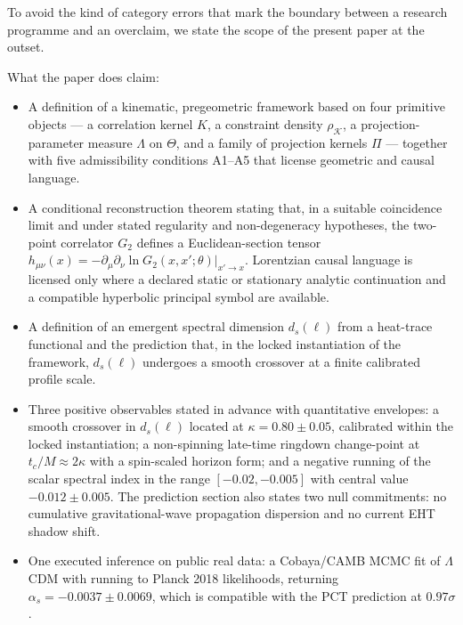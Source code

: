 ﻿\documentclass[12pt,a4paper]{article}
\theoremstyle{definition}
\begin{document}
To avoid the kind of category errors that mark the boundary between a research programme and an overclaim, we state the scope of the present paper at the outset.

What the paper does claim:
\begin{itemize}
  \item A definition of a kinematic, pregeometric framework based on four primitive objects --- a correlation kernel $K$, a constraint density $\rho_{\mathcal{K}}$, a projection-parameter measure $\Lambda$ on $\Theta$, and a family of projection kernels $\Pi$ --- together with five admissibility conditions A1--A5 that license geometric and causal language.
  \item A conditional reconstruction theorem stating that, in a suitable coincidence limit and under stated regularity and non-degeneracy hypotheses, the two-point correlator $G_2$ defines a Euclidean-section tensor $h_{\mu\nu}(x) = -\partial_\mu\partial_\nu \ln G_2(x,x';\theta)|_{x'\to x}$. Lorentzian causal language is licensed only where a declared static or stationary analytic continuation and a compatible hyperbolic principal symbol are available.
  \item A definition of an emergent spectral dimension $d_s(\ell)$ from a heat-trace functional and the prediction that, in the locked instantiation of the framework, $d_s(\ell)$ undergoes a smooth crossover at a finite calibrated profile scale.
  \item Three positive observables stated in advance with quantitative envelopes: a smooth crossover in $d_s(\ell)$ located at $\kappa = 0.80 \pm 0.05$, calibrated within the locked instantiation; a non-spinning late-time ringdown change-point at $t_c/M \approx 2\kappa$ with a spin-scaled horizon form; and a negative running of the scalar spectral index in the range $[-0.02,-0.005]$ with central value $-0.012 \pm 0.005$. The prediction section also states two null commitments: no cumulative gravitational-wave propagation dispersion and no current EHT shadow shift.
  \item One executed inference on public real data: a Cobaya/CAMB MCMC fit of $\Lambda$CDM with running to Planck 2018 likelihoods, returning $\alpha_s = -0.0037 \pm 0.0069$, which is compatible with the PCT prediction at $0.97\sigma$.
\end{itemize}
\end{document}
